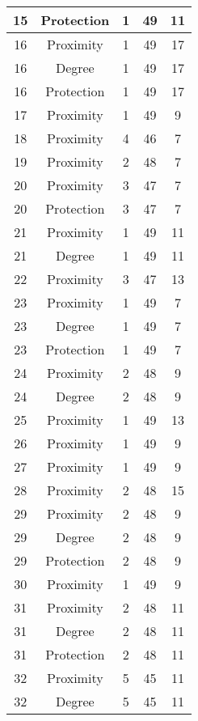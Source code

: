 \documentclass[results.tex]{subfiles}
\begin{document}
\begin{center}
\begin{tabular}{| c || c | c | c | c |}
    \hline
    15 & Protection & 1 & 49 & 11 \\ 
    \hline
    16 & Proximity & 1 & 49 & 17 \\ 
    \hline
    16 & Degree & 1 & 49 & 17 \\ 
    \hline
    16 & Protection & 1 & 49 & 17 \\ 
    \hline
    17 & Proximity & 1 & 49 & 9 \\ 
    \hline
    18 & Proximity & 4 & 46 & 7 \\ 
    \hline
    19 & Proximity & 2 & 48 & 7 \\ 
    \hline
    20 & Proximity & 3 & 47 & 7 \\ 
    \hline
    20 & Protection & 3 & 47 & 7 \\ 
    \hline
    21 & Proximity & 1 & 49 & 11 \\ 
    \hline
    21 & Degree & 1 & 49 & 11 \\ 
    \hline
    22 & Proximity & 3 & 47 & 13 \\ 
    \hline
    23 & Proximity & 1 & 49 & 7 \\ 
    \hline
    23 & Degree & 1 & 49 & 7 \\ 
    \hline
    23 & Protection & 1 & 49 & 7 \\ 
    \hline
    24 & Proximity & 2 & 48 & 9 \\ 
    \hline
    24 & Degree & 2 & 48 & 9 \\ 
    \hline
    25 & Proximity & 1 & 49 & 13 \\ 
    \hline
    26 & Proximity & 1 & 49 & 9 \\ 
    \hline
    27 & Proximity & 1 & 49 & 9 \\ 
    \hline
    28 & Proximity & 2 & 48 & 15 \\ 
    \hline
    29 & Proximity & 2 & 48 & 9 \\ 
    \hline
    29 & Degree & 2 & 48 & 9 \\ 
    \hline
    29 & Protection & 2 & 48 & 9 \\ 
    \hline
    30 & Proximity & 1 & 49 & 9 \\ 
    \hline
    31 & Proximity & 2 & 48 & 11 \\ 
    \hline
    31 & Degree & 2 & 48 & 11 \\ 
    \hline
    31 & Protection & 2 & 48 & 11 \\ 
    \hline
    32 & Proximity & 5 & 45 & 11 \\ 
    \hline
    32 & Degree & 5 & 45 & 11 \\ 

\end{tabular}
\end{center}
\end{document}
